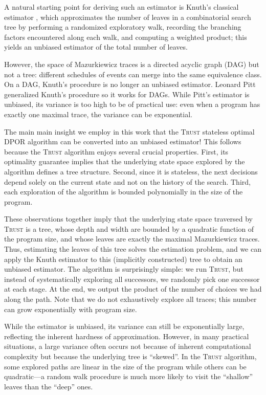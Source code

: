 \documentclass[acmsmall]{acmart}
\newcommand{\trust}{\textsc{Trust}\xspace}
\newcommand{\dpor}{\textsc{DPOR}\xspace}
\begin{document}
A natural starting point for deriving such an estimator is Knuth's classical
estimator \cite{knuth75}, which approximates the number of leaves in a
combinatorial search tree by performing a randomized exploratory
walk, recording the branching factors encountered along each walk, and
computing a weighted product; this yields an unbiased estimator of the total
number of leaves.


However, the space of Mazurkiewicz traces is a directed acyclic graph (DAG) but not a tree:
different schedules of events can merge into the same equivalence class.
On a DAG, Knuth's procedure is no longer an unbiased estimator.
Leonard Pitt generalized Knuth's procedure so it works for DAGs\cite{pitt}.
While Pitt's estimator is unbiased, its variance is too high to be of practical use: 
even when a program has exactly one maximal trace, the variance can be exponential.

The main main insight we employ in this work that the \trust stateless optimal \dpor algorithm \cite{trust}
can be converted into an unbiased estimator!
This follows because the \trust algorithm enjoys several crucial properties.
First, its optimality guarantee implies that the underlying state space explored by the algorithm defines a tree structure.
Second, since it is stateless, the next decisions depend solely on the current state and not on the history of the search.
Third, each exploration of the algorithm is bounded polynomially in the size of the program.

These observations together imply that the underlying state space traversed by \trust is a tree, whose depth and width are bounded by a quadratic function of the program size,
and whose leaves are exactly the maximal Mazurkiewicz traces.
Thus, estimating the leaves of this tree solves the estimation problem,
and we can apply the Knuth estimator to this (implicitly constructed) tree to obtain an unbiased estimator.
The algorithm is surprisingly simple: we run \trust, but instead of systematically exploring all successors, we randomly pick one successor at each stage.
At the end, we output the product of the number of choices we had along the path.
Note that we do not exhaustively explore all traces; this number can grow exponentially with program size.

While the estimator is unbiased, its variance can still be exponentially large,
reflecting the inherent hardness of approximation.
However, in many practical situations, a large variance often occurs not because of inherent computational complexity but because the underlying tree is ``skewed''.
In the \trust algorithm, some explored paths are linear in the size of the program while others can
be quadratic---a random walk procedure is much more likely to visit the ``shallow'' leaves than the ``deep'' ones.
\end{document}
